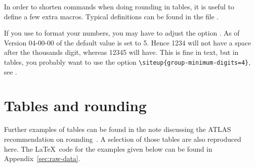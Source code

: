 \documentclass[UKenglish,texlive=2016]{\ATLASLATEXPATH atlasdoc}
\begin{document}
In order to shorten commands when doing rounding in tables, it is useful to define a few extra macros.
Typical definitions can be found in the file .

If you use  to format your numbers,
you may have to adjust the option .
As of Version 04-00-00 of  the default value is set to 5.
Hence \num{1234} will not have a space after the thousands digit,
whereas \num{12345} will have.
This is fine in text, but in tables, you probably want to use the option
\verb|\siteup{group-minimum-digits=4}|, see \Tabs{\ref{tab:minimum-digits1}}{\ref{tab:minimum-digits2}}.

\begin{table}[htbp]
  \centering
  \qquad
  \caption{Tables comparing different  values
  for the package .}
  \label{tab:minimum-digits}
\end{table}


\section{Tables and rounding}

Further examples of tables can be found in the note discussing the ATLAS recommendation on rounding~\cite{atlas-rounding}.
A selection of those tables are also reproduced here.
The \LaTeX\ code for the examples given below can be found in 
Appendix~\ref{sec:raw-data}.
\end{document}
